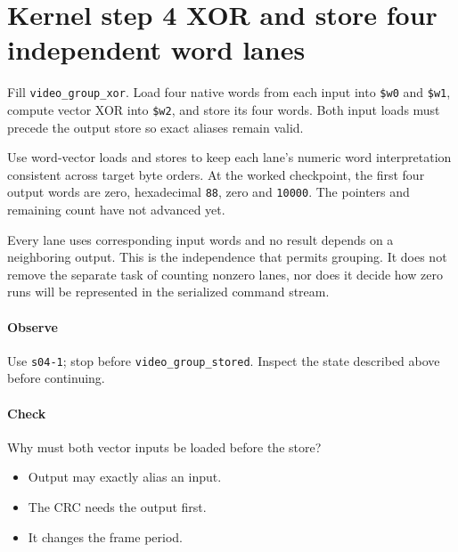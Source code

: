 \section{Kernel step 4 XOR and store four independent word lanes}
Fill \texttt{video\_group\_xor}. Load four native words from each input into \texttt{\$w0} and \texttt{\$w1}, compute vector XOR into \texttt{\$w2}, and store its four words. Both input loads must precede the output store so exact aliases remain valid.

Use word-vector loads and stores to keep each lane's numeric word interpretation consistent across target byte orders. At the worked checkpoint, the first four output words are zero, hexadecimal \texttt{88}, zero and \texttt{10000}. The pointers and remaining count have not advanced yet.

Every lane uses corresponding input words and no result depends on a neighboring output. This is the independence that permits grouping. It does not remove the separate task of counting nonzero lanes, nor does it decide how zero runs will be represented in the serialized command stream.

\paragraph{Observe} Use \texttt{s04-1}; stop before \texttt{video\_group\_stored}. Inspect the state described above before continuing.

\paragraph{Check} Why must both vector inputs be loaded before the store?
\begin{itemize}
  \item[A.] Output may exactly alias an input.
  \item[B.] The CRC needs the output first.
  \item[C.] It changes the frame period.
\end{itemize}

